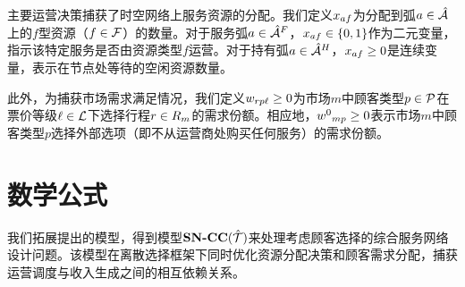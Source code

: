 主要运营决策捕获了时空网络上服务资源的分配。我们定义$x_{af}$为分配到弧$a \in \hat{\mathcal{A}}$上的$f$型资源（$f \in \mathcal{F}$）的数量。对于服务弧$a \in {\hat{\mathcal{A}}^F_{{}}}$，$x_{af} \in \{0, 1\}$作为二元变量，指示该特定服务是否由资源类型$f$运营。对于持有弧$a \in {\hat{\mathcal{A}}^H_{{}}}$，$x_{af} \ge 0$是连续变量，表示在节点处等待的空闲资源数量。

此外，为捕获市场需求满足情况，我们定义$w_{rp\ell} \ge 0$为市场$m$中顾客类型$p \in \mathcal{P}$在票价等级$\ell \in \mathcal{L}$下选择行程$r \in R_{m}$的需求份额。相应地，${w^0}_{mp} \ge 0$表示市场$m$中顾客类型$p$选择外部选项（即不从运营商处购买任何服务）的需求份额。

\section{数学公式}

我们拓展\citet{wei2020airline}提出的模型，得到模型$\textbf{SN-CC}({\hat{\mathcal{T}}})$来处理考虑顾客选择的综合服务网络设计问题。该模型在离散选择框架下同时优化资源分配决策和顾客需求分配，捕获运营调度与收入生成之间的相互依赖关系。


